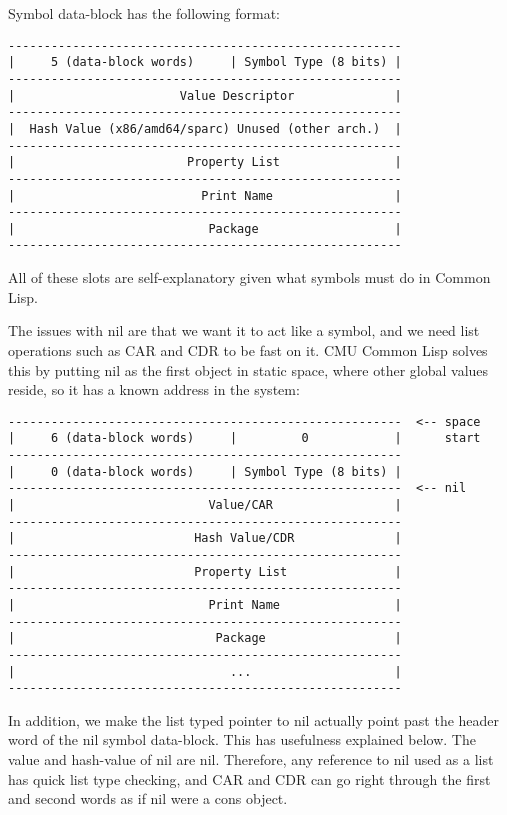 Symbol data-block has the following format:
\begin{verbatim}
-------------------------------------------------------
|     5 (data-block words)     | Symbol Type (8 bits) |
-------------------------------------------------------
|                       Value Descriptor              |
-------------------------------------------------------
|  Hash Value (x86/amd64/sparc) Unused (other arch.)  |
-------------------------------------------------------
|                        Property List                |
-------------------------------------------------------
|                          Print Name                 |
-------------------------------------------------------
|                           Package                   |
-------------------------------------------------------
\end{verbatim}

All of these slots are self-explanatory given what symbols must do in Common
Lisp.

The issues with nil are that we want it to act like a symbol, and we need list
operations such as CAR and CDR to be fast on it.  CMU Common Lisp solves this
by putting nil as the first object in static space, where other global values
reside, so it has a known address in the system:
\begin{verbatim}
-------------------------------------------------------  <-- space
|     6 (data-block words)     |         0            |      start
-------------------------------------------------------
|     0 (data-block words)     | Symbol Type (8 bits) |
-------------------------------------------------------  <-- nil
|                           Value/CAR                 |
-------------------------------------------------------
|                         Hash Value/CDR              |
-------------------------------------------------------
|                         Property List               |
-------------------------------------------------------
|                           Print Name                |
-------------------------------------------------------
|                            Package                  |
-------------------------------------------------------
|                              ...                    |
-------------------------------------------------------
\end{verbatim}
In addition, we make the list typed pointer to nil actually point past the
header word of the nil symbol data-block.  This has usefulness explained below.
The value and hash-value of nil are nil.  Therefore, any reference to nil used
as a list has quick list type checking, and CAR and CDR can go right through
the first and second words as if nil were a cons object.


